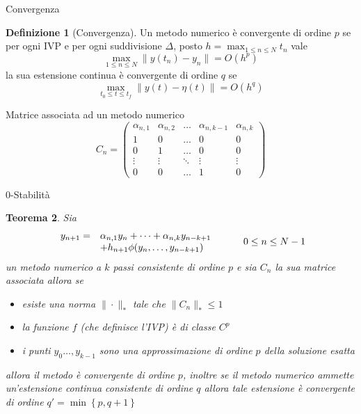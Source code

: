 \documentclass[intlimits]{beamer}
\numberwithin{equation}{section}
\theoremstyle{plain}
\newtheorem{teor}{Teorema}[section]
\theoremstyle{definition}
\newtheorem{defin}[teor]{Definizione}
\theoremstyle{remark}
\begin{document}
\begin{frame}{Convergenza}
 \begin{defin}[Convergenza]
 Un metodo numerico è convergente di ordine $p$ se per ogni IVP e per ogni suddivisione $\Delta$, 
 posto $\displaystyle h = \max_{1 \le n \le N} t_n$ vale
$$
\max_{1 \le n \le N} \| y(t_n) -  y_n \| = O(h^p)
$$
la sua estensione continua è convergente di ordine $q$ se 
$$
\max_{t_0 \le t \le t_f} \| y(t) - \eta (t) \| = O(h^q)
$$
\end{defin}
\end{frame}

\begin{frame}{Matrice associata ad un metodo numerico}
$$
C_n=
\begin{pmatrix}
 \alpha_{n,1}	&	\alpha_{n,2}	&	\dots	&	\alpha_{n,k-1}	&	\alpha_{n,k}	\\
      1		&		0	&	\dots	&		0	&		0	\\
      0		&		1	&	\dots	&		0	&		0	\\
      \vdots	&	\vdots		&	\ddots	&	\vdots		&	\vdots		\\
      0		&		0	&	\dots	&		1	&		0
\end{pmatrix}
$$

\end{frame}


\begin{frame}{$0$-Stabilità}
 \begin{teor}
Sia 
$$
\begin{array}{c lc}
y_{n+1} =	&	 \alpha_{n,1} y_n + \dots +\alpha_{n,k} y_{n-k+1} \\
		&	+ h_{n+1} \phi (y_n, \dots , y_{n-k+1})
\end{array}
\hspace{1cm}
0 \le n \le N-1
$$
un metodo numerico a $k$ passi consistente di ordine $p$ e sia $C_n$
la sua matrice associata allora se
\begin{itemize}
 \item esiste una norma $\| \cdot \|_{*}$ tale che $\| C_n \|_{*} \le 1$
 \item la funzione $f$ (che definisce l'IVP) è di classe $C^p$
 \item i punti $y_0 \dots , y_{k-1}$ sono una approssimazione di ordine $p$ della soluzione esatta
\end{itemize}
allora il metodo è convergente di ordine $p$, inoltre se il metodo numerico ammette un'estensione 
continua consistente di ordine $q$ allora tale estensione è convergente di ordine 
$q'=\min \left \{ p , q+1 \right \} $
\end{teor}
\end{frame}
\end{document}
